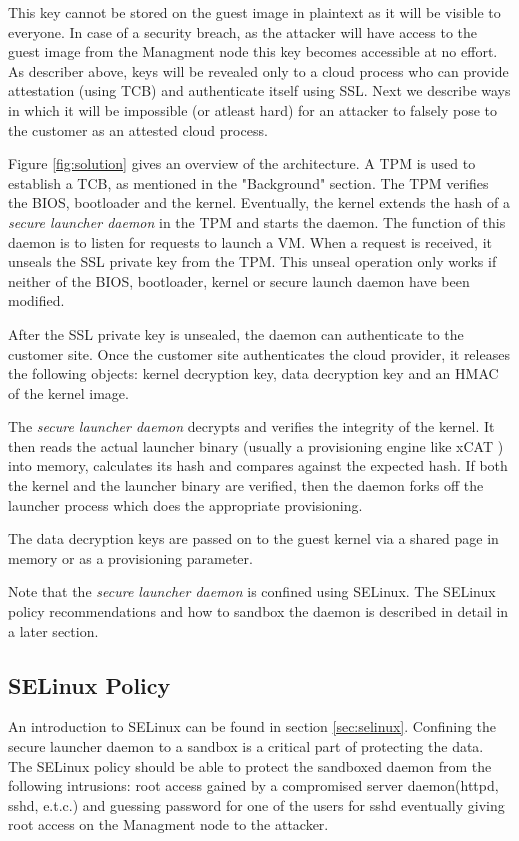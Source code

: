 \documentclass[10pt,twocolumn,pdftex]{article}
\begin{document}
This key cannot be stored on the guest image in plaintext as it will be visible to everyone. In case of a security breach, as the attacker will have access to the guest image from the Managment node this key becomes accessible at no effort.  As describer above, keys will be revealed only to a cloud process who can provide attestation (using TCB) and authenticate itself using SSL. Next we describe ways in which it will be impossible (or atleast hard) for an attacker to falsely pose to the customer as an attested cloud process.

Figure \ref{fig:solution} gives an overview of the architecture.
A TPM is used to establish a TCB, as mentioned in the "Background" section. The TPM verifies the BIOS, bootloader and the kernel. Eventually, the kernel extends the hash of a \emph{secure launcher daemon} in the TPM and starts the daemon. The function of this daemon is to listen for requests to launch a VM. When a request is received, it unseals the SSL private key from the TPM. This unseal operation only works if neither of the BIOS, bootloader, kernel or secure launch daemon have been modified.

After the SSL private key is unsealed, the daemon can authenticate to the customer site. Once the customer site authenticates the cloud provider, it releases the following objects: kernel decryption key, data decryption key and an HMAC of the kernel image.

The \emph{secure launcher daemon} decrypts and verifies the integrity of the kernel. It then reads the actual launcher binary (usually a provisioning engine like xCAT \cite{xCAT}) into memory, calculates its hash and compares against the expected hash. If both the kernel and the launcher binary are verified, then the daemon forks off the launcher process which does the appropriate provisioning.

The data decryption keys are passed on to the guest kernel via a shared page in memory or as a provisioning parameter.

Note that the \emph{secure launcher daemon} is confined using SELinux. The SELinux policy recommendations and how to sandbox the daemon is described in detail in a later section.

\subsection{SELinux Policy}
An introduction to SELinux can be found in section \ref{sec:selinux}. Confining the secure launcher daemon to a sandbox is a critical part of protecting the data. The SELinux policy should be able to protect the sandboxed daemon from the following intrusions: root access gained by a compromised server daemon(httpd, sshd, e.t.c.) and guessing password  for one of the users for sshd eventually giving root access on the Managment node to the attacker. 
\end{document}
